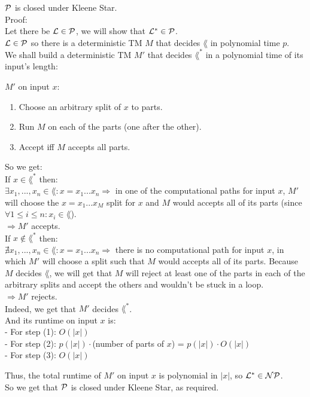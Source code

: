 $\mathcal{P}$ is closed under Kleene Star. \\

Proof: \\

Let there be $\mathcal{L} \in \mathcal{P}$, we will show that $\mathcal{L}^* \in \mathcal{P}$. \\
$\mathcal{L} \in \mathcal{P}$ so there is a deterministic TM $M$ that decides $\lang$ in polynomial time $p$. \\
We shall build a deterministic TM $M'$ that decides $\lang^*$ in a polynomial time of its input's length:

$M'$ on input $x$:

{
\color{red}
{

    \begin{enumerate}[1., itemsep=5pt]

        \item Choose an arbitrary split of $x$ to parts.

        \item Run $M$ on each of the parts (one after the other).

        \item Accept iff $M$ accepts all parts.

    \end{enumerate}

    So we get: \\
    If $x \in \lang^*$ then: \\
    $\exists x_1,...,x_n \in \lang: x=x_1...x_n \Rightarrow $ in one of the computational
    paths for input $x$, $M'$ will choose the $x=x_1...x_M$ split for $x$ and $M$ would accepts all of its parts
    (since $\forall 1 \leq i \leq n: x_i \in \lang$). \\
    $\Rightarrow M'$ accepts. \\

    If $x \notin \lang^*$ then: \\
    $\nexists x_1,...,x_n \in \lang: x=x_1...x_n \Rightarrow $ there is no computational
    path for input $x$, in which $M'$ will choose a split such that $M$ would accepts all of its parts.
    Because $M$ decides $\lang$, we will get that $M$ will reject at least one of the parts in
    each of the arbitrary splits and accept the others and wouldn't be stuck in a loop. \\
    $\Rightarrow M'$ rejects. \\

    Indeed, we get that $M'$ decides $\lang^*$. \\
    And its runtime on input $x$ is: \\
    - For step (1): $O(|x|)$ \\
    - For step (2): $p(|x|) \cdot$(number of parts of $x$) = $p(|x|) \cdot O(|x|)$ \\
    - For step (3): $O(|x|)$
}
}

Thus, the total runtime of $M'$ on input $x$ is polynomial in $|x|$, so $\mathcal{L}^* \in \mathcal{N}\mathcal{P}$. \\
So we get that $\mathcal{P}$ is closed under Kleene Star, as required. \\

